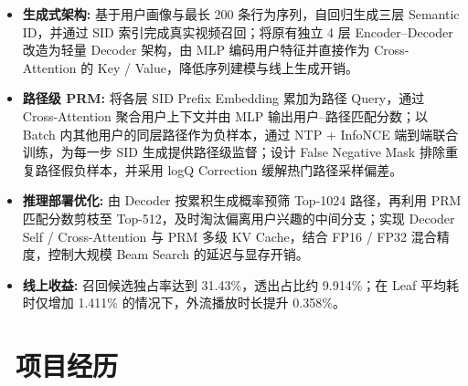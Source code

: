 \documentclass{resume}
\begin{document}
\vspace{-0.6em}
\begin{itemize}
  \item \textbf{生成式架构:}
  基于用户画像与最长 200 条行为序列，自回归生成三层 Semantic ID，并通过 SID 索引完成真实视频召回；将原有独立 4 层 Encoder--Decoder 改造为轻量 Decoder 架构，由 MLP 编码用户特征并直接作为 Cross-Attention 的 Key / Value，降低序列建模与线上生成开销。

  \item \textbf{路径级 PRM:}
  将各层 SID Prefix Embedding 累加为路径 Query，通过 Cross-Attention 聚合用户上下文并由 MLP 输出用户--路径匹配分数；以 Batch 内其他用户的同层路径作为负样本，通过 NTP + InfoNCE 端到端联合训练，为每一步 SID 生成提供路径级监督；设计 False Negative Mask 排除重复路径假负样本，并采用 logQ Correction 缓解热门路径采样偏差。

  \item \textbf{推理部署优化:}
  由 Decoder 按累积生成概率预筛 Top-1024 路径，再利用 PRM 匹配分数剪枝至 Top-512，及时淘汰偏离用户兴趣的中间分支；实现 Decoder Self / Cross-Attention 与 PRM 多级 KV Cache，结合 FP16 / FP32 混合精度，控制大规模 Beam Search 的延迟与显存开销。

  \item \textbf{线上收益:}
  召回候选独占率达到 31.43\%，透出占比约 9.914\%；在 Leaf 平均耗时仅增加 1.411\% 的情况下，外流播放时长提升 0.358\%。
\end{itemize}


\vspace{-1.0em}
\section{\faBriefcase\ 项目经历}
\vspace{-0.2em}

\end{document}
